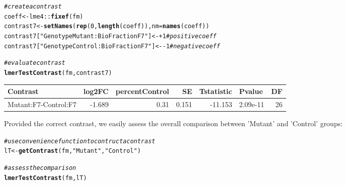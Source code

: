 \documentclass[11pt]{elife}\usepackage[]{graphicx}\usepackage[]{color}
\makeatletter
\newcommand{\hlnum}[1]{\textcolor[rgb]{0.686,0.059,0.569}{#1}}%
\newcommand{\hlstr}[1]{\textcolor[rgb]{0.192,0.494,0.8}{#1}}%
\newcommand{\hlcom}[1]{\textcolor[rgb]{0.678,0.584,0.686}{\textit{#1}}}%
\newcommand{\hlopt}[1]{\textcolor[rgb]{0,0,0}{#1}}%
\newcommand{\hlstd}[1]{\textcolor[rgb]{0.345,0.345,0.345}{#1}}%
\newcommand{\hlkwb}[1]{\textcolor[rgb]{0.69,0.353,0.396}{#1}}%
\newcommand{\hlkwc}[1]{\textcolor[rgb]{0.333,0.667,0.333}{#1}}%
\newcommand{\hlkwd}[1]{\textcolor[rgb]{0.737,0.353,0.396}{\textbf{#1}}}%
\newenvironment{kframe}{%
 \def\at@end@of@kframe{}%
 \ifinner\ifhmode%
  \def\at@end@of@kframe{\end{minipage}}%
  \begin{minipage}{\columnwidth}%
 \fi\fi%
 \def\FrameCommand##1{\hskip\@totalleftmargin \hskip-\fboxsep
 \colorbox{shadecolor}{##1}\hskip-\fboxsep
     \hskip-\linewidth \hskip-\@totalleftmargin \hskip\columnwidth}%
 \MakeFramed {\advance\hsize-\width
   \@totalleftmargin\z@ \linewidth\hsize
   \@setminipage}}%
 {\par\unskip\endMakeFramed%
 \at@end@of@kframe}
\newenvironment{knitrout}{}{} %
\makeatother
\begin{document}
\begin{knitrout}
\color{fgcolor}\begin{kframe}
\begin{alltt}
\hlcom{# create a contrast}
\hlstd{coeff} \hlkwb{<-} \hlstd{lme4}\hlopt{::}\hlkwd{fixef}\hlstd{(fm)}
\hlstd{contrast7} \hlkwb{<-} \hlkwd{setNames}\hlstd{(}\hlkwd{rep}\hlstd{(}\hlnum{0}\hlstd{,}\hlkwd{length}\hlstd{(coeff)),} \hlkwc{nm} \hlstd{=} \hlkwd{names}\hlstd{(coeff))}
\hlstd{contrast7[}\hlstr{"GenotypeMutant:BioFractionF7"}\hlstd{]} \hlkwb{<-} \hlopt{+}\hlnum{1} \hlcom{# positive coeff}
\hlstd{contrast7[}\hlstr{"GenotypeControl:BioFractionF7"}\hlstd{]} \hlkwb{<-} \hlopt{-}\hlnum{1} \hlcom{# negative coeff}

\hlcom{# evaluate contrast}
\hlkwd{lmerTestContrast}\hlstd{(fm, contrast7)}
\end{alltt}
\end{kframe}
\end{knitrout}

\begin{knitrout}
\color{fgcolor}
\begin{tabular}{l|r|r|r|r|l|r}
\hline
Contrast & log2FC & percentControl & SE & Tstatistic & Pvalue & DF\\
\hline
Mutant:F7-Control:F7 & -1.689 & 0.31 & 0.151 & -11.153 & 2.09e-11 & 26\\
\hline
\end{tabular}


\end{knitrout}

Provided the correct contrast, we easily assess the overall comparison between 
'Mutant' and 'Control' groups:

\begin{knitrout}
\color{fgcolor}\begin{kframe}
\begin{alltt}
\hlcom{# use convenience function to contruct a contrast}
\hlstd{lT} \hlkwb{<-} \hlkwd{getContrast}\hlstd{(fm,} \hlstr{"Mutant"}\hlstd{,}\hlstr{"Control"}\hlstd{)}

\hlcom{# assess the comparison}
\hlkwd{lmerTestContrast}\hlstd{(fm, lT)}
\end{alltt}
\end{kframe}
\end{knitrout}
\end{document}
